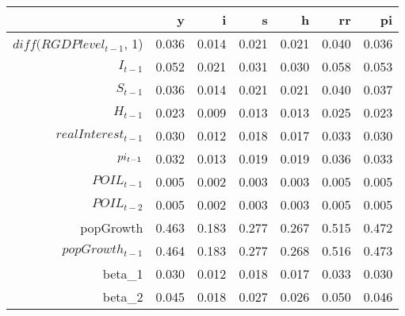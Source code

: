 \begin{table}[ht]
\centering
\begin{tabular}{rrrrrrr}
  \hline
 & y & i & s & h & rr & pi \\ 
  \hline
$diff(RGDPlevel_{t-1}$, 1) & 0.036 & 0.014 & 0.021 & 0.021 & 0.040 & 0.036 \\ 
  $I_{t-1}$ & 0.052 & 0.021 & 0.031 & 0.030 & 0.058 & 0.053 \\ 
  $S_{t-1}$ & 0.036 & 0.014 & 0.021 & 0.021 & 0.040 & 0.037 \\ 
  $H_{t-1}$ & 0.023 & 0.009 & 0.013 & 0.013 & 0.025 & 0.023 \\ 
  $realInterest_{t-1}$ & 0.030 & 0.012 & 0.018 & 0.017 & 0.033 & 0.030 \\ 
  $\\pi_{t-1}$ & 0.032 & 0.013 & 0.019 & 0.019 & 0.036 & 0.033 \\ 
  $POIL_{t-1}$ & 0.005 & 0.002 & 0.003 & 0.003 & 0.005 & 0.005 \\ 
  $POIL_{t-2}$ & 0.005 & 0.002 & 0.003 & 0.003 & 0.005 & 0.005 \\ 
  popGrowth & 0.463 & 0.183 & 0.277 & 0.267 & 0.515 & 0.472 \\ 
  $popGrowth_{t-1}$ & 0.464 & 0.183 & 0.277 & 0.268 & 0.516 & 0.473 \\ 
  beta_1 & 0.030 & 0.012 & 0.018 & 0.017 & 0.033 & 0.030 \\ 
  beta_2 & 0.045 & 0.018 & 0.027 & 0.026 & 0.050 & 0.046 \\ 
   \hline
\end{tabular}
\end{table}
